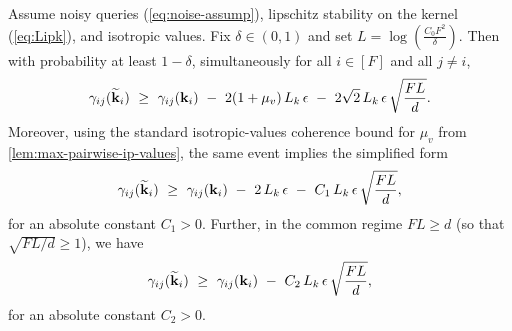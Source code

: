 \begin{theorem}
\label{thm:noised-lip-isovalues}
Assume noisy queries (\cref{eq:noise-assump}), lipschitz stability on the kernel (\cref{eq:Lipk}), and isotropic values.
Fix $\delta\in(0,1)$ and set $L= \log(\tfrac{C_0F^2}{\delta})$.
Then with probability at least $1-\delta$, simultaneously for all $i\in[F]$ and all $j\neq i$,
\begin{equation}
\gamma_{ij}(\widetilde{{\mathbf{k}}}_{i})
\ \ge\
\gamma_{ij}({\mathbf{k}}_{i})
\ -\ 2(1+\mu_{v})\,L_{k}\,\epsilon
\ -\ 2\sqrt{2}\,L_{k}\,\epsilon\,\sqrt{\frac{FL}{d}}.
\label{eq:thm1-main}
\end{equation}
Moreover, using the standard isotropic-values coherence bound for $\mu_{v}$ from \cref{lem:max-pairwise-ip-values},
the same event implies the simplified form
\begin{equation}
\gamma_{ij}(\widetilde{{\mathbf{k}}}_{i})
\ \ge\
\gamma_{ij}({\mathbf{k}}_{i})
\ -\ 2\,L_{k}\,\epsilon
\ -\ C_{1}\,L_{k}\,\epsilon\,\sqrt{\frac{FL}{d}},
\label{eq:thm1-absorbed}
\end{equation}
for an absolute constant $C_{1}>0$. Further, in the common regime $FL \ge d$ (so that $\sqrt{FL/d}\ge 1$), we have
\begin{equation}
\gamma_{ij}(\widetilde{{\mathbf{k}}}_{i})
\ \ge\
\gamma_{ij}({\mathbf{k}}_{i})
\ -\ C_{\mathrm{2}}\,L_{k}\,\epsilon\,\sqrt{\frac{FL}{d}},
\label{eq:thm1-pairwise-simplified}
\end{equation}
for an absolute constant $C_{\mathrm{2}}>0$.
\end{theorem}

